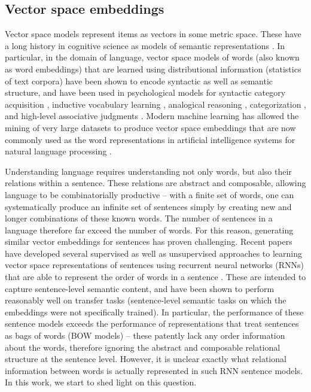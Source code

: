 \subsection{Vector space embeddings}
Vector space models represent items as vectors in some metric space. These have a long history in cognitive science as models of semantic representations \citep{steyvers2006multidimensional, beals1968foundations, pereira2016comparative}. In particular, in the domain of language, vector space models of words (also known as word embeddings) that are learned using distributional information (statistics of text corpora) have been shown to encode syntactic as well as semantic structure, and have been used in psychological models for syntactic category acquisition \citep{redington1998distributional}, inductive vocabulary learning \citep{landauer1997solution}, analogical reasoning \citep{rumelhart1973model}, categorization \citep{jones2007representing}, and high-level associative judgments \citep{bhatia2017associative}. Modern machine learning has allowed the mining of very large datasets to produce vector space embeddings that are now commonly used as the word representations in artificial intelligence systems for natural language processing \citep{pennington14, mikolov2013distributed}.

Understanding language requires understanding not only words, but also their relations within a sentence. These relations are abstract and composable, allowing language to be combinatorially productive -- with a finite set of words, one can systematically produce an infinite set of sentences simply by creating new and longer combinations of these known words. The number of sentences in a language therefore far exceed the number of words. For this reason, generating similar vector embeddings for sentences has proven challenging. Recent papers have developed several supervised as well as unsupervised approaches to learning vector space representations of sentences using recurrent neural networks (RNNs) that are able to represent the order of words in a sentence \citep{kiros2015skip, Hill:2016uu, Conneau:2017uf}. These are intended to capture sentence-level semantic content, and have been shown to perform reasonably well on transfer tasks (sentence-level semantic tasks on which the embeddings were not specifically trained). In particular, the performance of these sentence models exceeds the performance of representations that treat sentences as bags of words (BOW models) -- these patently lack any order information about the words, therefore ignoring the abstract and composable relational structure at the sentence level. However, it is unclear exactly what relational information between words is actually represented in such RNN sentence models. In this work, we start to shed light on this question.


